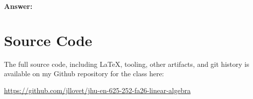 \documentclass[10pt,letterpaper,final]{report}
\begin{document}
\medskip
\noindent\textbf{Answer:}
\medskip

\pagebreak

\section*{Source Code}
The full source code, including LaTeX, tooling, other artifacts, and git history is available on my Github repository for the class here:
\begin{center}
  \url{https://github.com/jllovet/jhu-en-625-252-fa26-linear-algebra}
\end{center}

\printbibliography
\end{document}
